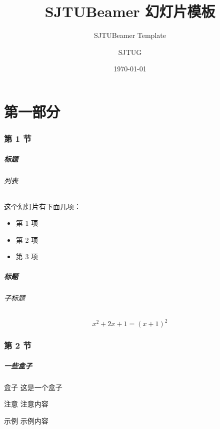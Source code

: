 \documentclass[
    aspectratio=169,  %
]{ctexbeamer}
\institute[SJTUG]{上海交通大学 Linux 用户组} %
\title{SJTUBeamer 幻灯片模板}         %
\subtitle{SJTUBeamer Template}       %
\author{SJTUG}                       %
\date{\today}                        %
\begin{document}
\maketitle                           %

\part{第一部分}

\AtBeginSection[]{
  \begin{frame}
    \sectionpage                        %
  \end{frame}
}

\section{第 1 节}

\begin{frame}
  \frametitle{标题}
  \paragraph{列表} 这个\alert{幻灯片}有下面几项：
  \begin{itemize}
    \item 第 1 项
    \item 第 2 项
    \item 第 3 项
  \end{itemize}
\end{frame}

\begin{frame}
  \frametitle{标题}
  \framesubtitle{子标题}
  \begin{equation}
    x^2+2x+1=(x+1)^2
  \end{equation}
\end{frame}

\section{第 2 节}
\begin{frame}
  \frametitle{一些盒子}
  \begin{block}{盒子}
    这是一个盒子\cite{thelegendofjiang}
  \end{block}
  \begin{alertblock}{注意}
    注意内容
  \end{alertblock}
  \begin{exampleblock}{示例}
    示例内容
  \end{exampleblock}
\end{frame}
\end{document}
